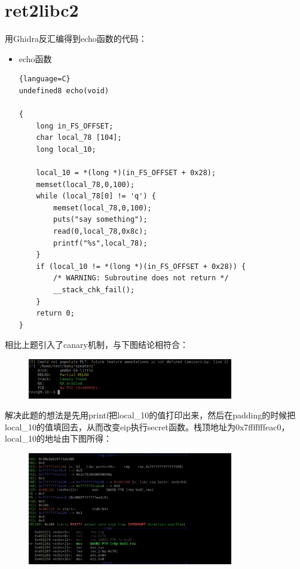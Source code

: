 \documentclass{article}
\begin{document}
\section{ret2libc2}
    用Ghidra反汇编得到echo函数的代码：
     \begin{itemize}
    	\item echo函数
    	\begin{lstlisting}{language=C}
undefined8 echo(void)

{
	long in_FS_OFFSET;
	char local_78 [104];
	long local_10;
	
	local_10 = *(long *)(in_FS_OFFSET + 0x28);
	memset(local_78,0,100);
	while (local_78[0] != 'q') {
		memset(local_78,0,100);
		puts("say something");
		read(0,local_78,0x8c);
		printf("%s",local_78);
	}
	if (local_10 != *(long *)(in_FS_OFFSET + 0x28)) {
		/* WARNING: Subroutine does not return */
		__stack_chk_fail();
	}
	return 0;
}
    	\end{lstlisting}    		
    \end{itemize}
    相比上题引入了canary机制，与下图结论相符合：
    \begin{figure}[H]
    	\begin{center}
    		\includegraphics[width=0.8\textwidth]{4.png}
    	\end{center}
    \end{figure}
    解决此题的想法是先用printf把local\_10的值打印出来，然后在padding的时候把local\_10的值填回去，从而改变eip执行secret函数。栈顶地址为0x7fffffffeac0，local\_10的地址由下图所得：
    \begin{figure}[H]
    	\begin{center}
    		\includegraphics[width=0.8\textwidth]{5.png}
    	\end{center}
    \end{figure}
\end{document}
